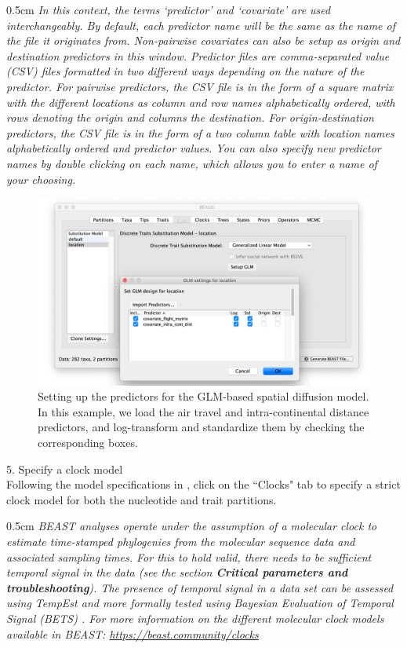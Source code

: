 \documentclass{article}
\newcommand{\ann}[1]{
\begin{adjustwidth}{0.5cm}{}
\it{#1}\\
\end{adjustwidth}}
\begin{document}
\ann{In this context, the terms `predictor' and `covariate' are used interchangeably.  
By default, each predictor name will be the same as the name of the file it originates from. Non-pairwise covariates can also be setup as origin and destination predictors in this window. Predictor files are comma-separated value (CSV) files formatted in two different ways depending on the nature of the predictor. For pairwise predictors, the CSV file is in the form of a square matrix with the different locations as column and row names alphabetically ordered, with rows denoting the origin and columns the destination. %
For origin-destination predictors, the CSV file is in the form of a two column table with location names alphabetically ordered and predictor values.
You can also specify new predictor names by double clicking on each name, which allows you to enter a name of your choosing.
}

\begin{figure}[!ht]
    \centering
    \includegraphics[width=1.0\textwidth]{figs/GLM.pdf}
    \caption{Setting up the predictors for the GLM-based spatial diffusion model. In this example, we load the air travel and intra-continental distance predictors, and log-transform and standardize them by checking the corresponding boxes.}
    \label{fig:GLM}
\end{figure}

5. Specify a clock model\\

Following the model specifications in \cite{travhist}, click on the ``Clocks" tab to specify a strict clock model for both the nucleotide and trait partitions.\\
\ann{BEAST analyses operate under the assumption of a molecular clock to estimate time-stamped phylogenies from the molecular sequence data and associated sampling times.
For this to hold valid, there needs to be sufficient temporal signal in the data (see the section \textbf{Critical parameters and troubleshooting}).
The presence of temporal signal in a data set can be assessed using TempEst \cite{tempest} and more formally tested using Bayesian Evaluation of Temporal Signal (BETS) \cite{bets}.
For more information on the different molecular clock models available in BEAST: {\upshape\url{https://beast.community/clocks}}}
\end{document}
